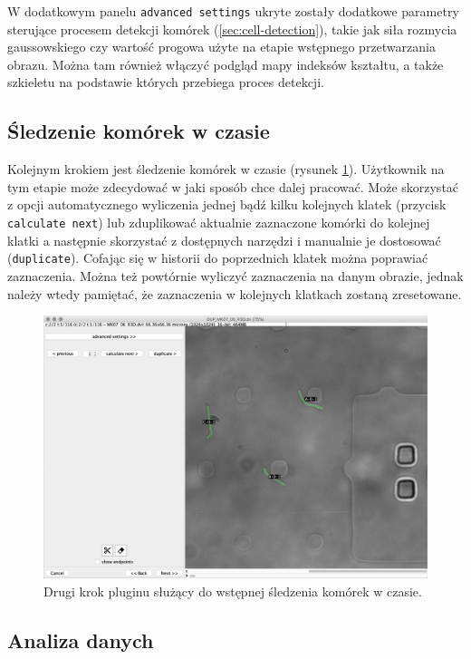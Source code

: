 \documentclass[declaration,shortabstract,mgr]{iithesis}
\begin{document}
W dodatkowym panelu \texttt{advanced settings} ukryte zostały dodatkowe parametry sterujące procesem detekcji komórek (\ref{sec:cell-detection}), takie jak siła rozmycia gaussowskiego czy wartość progowa użyte na etapie wstępnego przetwarzania obrazu.
Można tam również włączyć podgląd mapy indeksów kształtu, a także szkieletu na podstawie których przebiega proces detekcji.

\subsection{Śledzenie komórek w czasie}

Kolejnym krokiem jest śledzenie komórek w czasie (rysunek \ref{fig:ui-step-tracker}).
Użytkownik na tym etapie może zdecydować w jaki sposób chce dalej pracować.
Może skorzystać z opcji automatycznego wyliczenia jednej bądź kilku kolejnych klatek (przycisk \texttt{calculate next}) lub zduplikować aktualnie zaznaczone komórki do kolejnej klatki a następnie skorzystać z dostępnych narzędzi i manualnie je dostosować (\texttt{duplicate}).
Cofając się w historii do poprzednich klatek można poprawiać zaznaczenia. Można też powtórnie wyliczyć zaznaczenia na danym obrazie, jednak należy wtedy pamiętać, że zaznaczenia w kolejnych klatkach zostaną zresetowane.

\begin{figure}
  \centering
  \includegraphics[width=\textwidth]{images/ui-step-tracker.png}
  \caption{Drugi krok pluginu służący do wstępnej śledzenia komórek w czasie.}
  \label{fig:ui-step-tracker}
\end{figure}

\subsection{Analiza danych}
\end{document}
